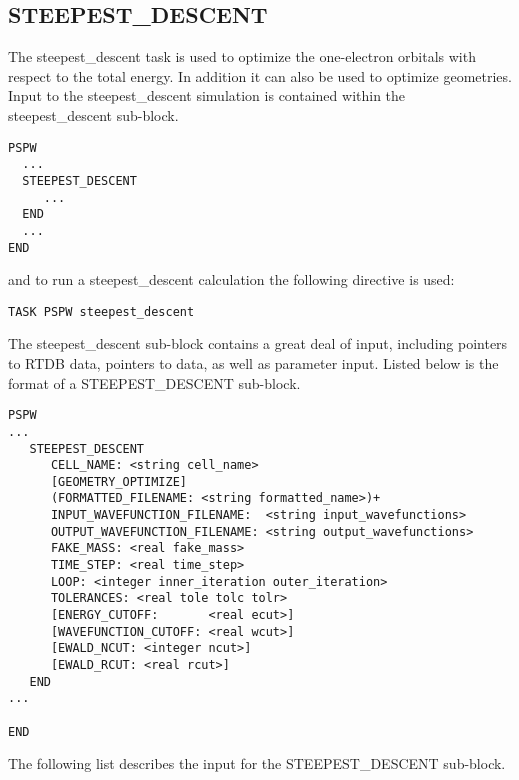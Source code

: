\subsection{STEEPEST\_DESCENT} 
The steepest\_descent task is used to optimize the one-electron orbitals
with respect to the total energy.  In addition it can also be used to optimize
geometries.
Input to the steepest\_descent simulation is contained
within the steepest\_descent sub-block.
\begin{verbatim}
PSPW
  ...
  STEEPEST_DESCENT
     ...
  END
  ...
END
\end{verbatim}
and to run a steepest\_descent calculation the following directive is used:
\begin{verbatim}
TASK PSPW steepest_descent 
\end{verbatim}
The steepest\_descent sub-block contains a great deal
of input, including pointers to RTDB data, pointers to data, as well as
parameter input.  Listed below is the format of a STEEPEST\_DESCENT sub-block.
\begin{verbatim}
PSPW
...
   STEEPEST_DESCENT
      CELL_NAME: <string cell_name>
      [GEOMETRY_OPTIMIZE]
      (FORMATTED_FILENAME: <string formatted_name>)+
      INPUT_WAVEFUNCTION_FILENAME:  <string input_wavefunctions>
      OUTPUT_WAVEFUNCTION_FILENAME: <string output_wavefunctions>
      FAKE_MASS: <real fake_mass>
      TIME_STEP: <real time_step>
      LOOP: <integer inner_iteration outer_iteration>
      TOLERANCES: <real tole tolc tolr>
      [ENERGY_CUTOFF:       <real ecut>]
      [WAVEFUNCTION_CUTOFF: <real wcut>]
      [EWALD_NCUT: <integer ncut>]
      [EWALD_RCUT: <real rcut>]
   END
...

END
\end{verbatim}
The following list describes the input for the STEEPEST\_DESCENT
sub-block.
